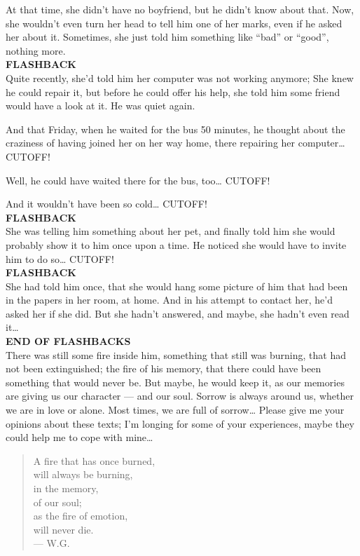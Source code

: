 At that time, she didn't have no boyfriend, but he didn't know about that. 
Now, she wouldn't even turn her head to tell him one of her marks, even if he asked her about it. 
Sometimes, she just told him something like \enquote{bad} or \enquote{good}, nothing more. \\
\textbf{FLASHBACK}\\
Quite recently, she'd told him her computer was not working anymore; She knew he could repair it, but before he could offer his help, she told him some friend would have a look at it. 
He was quiet again.

And that Friday, when he waited for the bus 50 minutes, he thought about the craziness of having joined her on her way home, there repairing her computer\ldots
CUTOFF!

Well, he could have waited there for the bus, too\ldots
CUTOFF!

And it wouldn't have been so cold\ldots
CUTOFF!\\
\textbf{FLASHBACK}\\
She was telling him something about her pet, and finally told him she would probably show it to him once upon a time. 
He noticed she would have to invite him to do so\ldots
CUTOFF!\\
\textbf{FLASHBACK}\\
She had told him once, that she would hang some picture of him that had been in the papers in her room, at home. 
And in his attempt to contact her, he'd asked her if she did. 
But she hadn't answered, and maybe, she hadn't even read it\ldots\\
\textbf{END OF FLASHBACKS}\\
There was still some fire inside him, something that still was burning, that had not been extinguished; the fire of his memory, that there could have been something that would never be. 
But maybe, he would keep it, as our memories are giving us our character --- and our soul. 
Sorrow is always around us, whether we are in love or alone. 
Most times, we are full of sorrow\ldots
Please give me your opinions about these texts; I'm longing for some of your experiences, maybe they could help me to cope with mine\ldots

\begin{quote}
A fire that has once burned, \\
will always be burning, \\
in the memory, \\
of our soul; \\
as the fire of emotion, \\
will never die. \\
--- W.G.
\end{quote}

